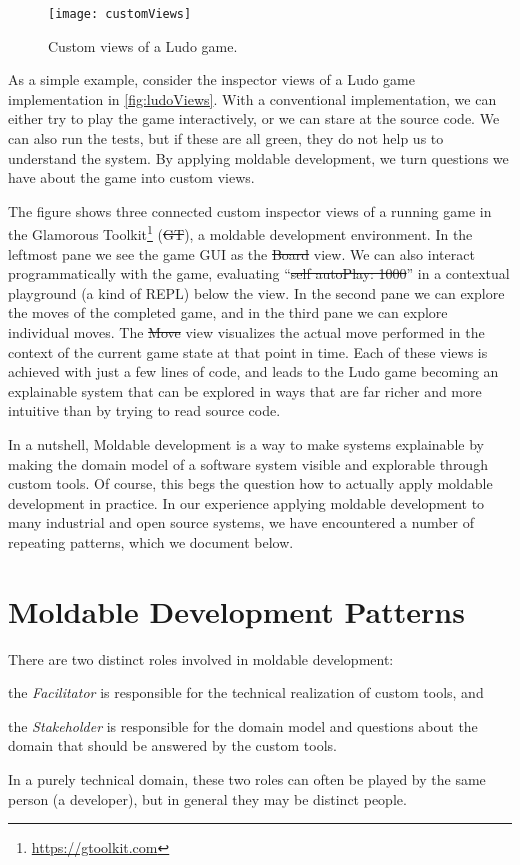 \documentclass[sigconf]{acmart}
\newcommand{\GT}{\st{GT}\xspace} %
\begin{document}
\begin{figure}[h]
  \texttt{[image: customViews]}
  \caption{Custom views of a Ludo game.}
  \label{fig:ludoViews}
\end{figure}

As a simple example, consider the inspector views of a Ludo game implementation in \autoref{fig:ludoViews}.
With a conventional implementation, we can either try to play the game interactively, or we can stare at the source code.
We can also run the tests, but if these are all green, they do not help us to understand the system.
By applying moldable development, we turn questions we have about the game into custom views.

The figure shows three connected custom inspector views of a running game in the Glamorous Toolkit\footnote{\url{https://gtoolkit.com}} (\GT), a moldable development environment.
In the leftmost pane we see the game GUI as the \st{Board} view.
We can also interact programmatically with the game, evaluating ``\st{self autoPlay: 1000}'' in a contextual playground (a kind of REPL) below the view.
In the second pane we can explore the moves of  the completed game, and in the third pane we can explore individual moves.
The \st{Move} view visualizes the actual move performed in the context of the current game state at that point in time.
Each of these views is achieved with just a few lines of code, and leads to the Ludo game becoming an explainable system that can be explored in ways that are far richer and more intuitive than by trying to read source code.

In a nutshell, Moldable development is a way to make systems explainable by making the domain model of a software system visible and explorable through custom tools.
Of course, this begs the question how to actually apply moldable development in practice.
In our experience applying moldable development to many industrial and open source systems, we have encountered a number of repeating patterns, which we document below.

\section{Moldable Development Patterns}

There are two distinct roles involved in moldable development:
\begin{inparaenum}[(i)]
\item the \emph{Facilitator} is responsible for the technical realization of custom tools, and
\item the \emph{Stakeholder} is responsible for the domain model and questions about the domain that should be answered by the custom tools.
\end{inparaenum}
In a purely technical domain, these two roles can often be played by the same person (\ie a developer), but in general they may be distinct people.
\end{document}
